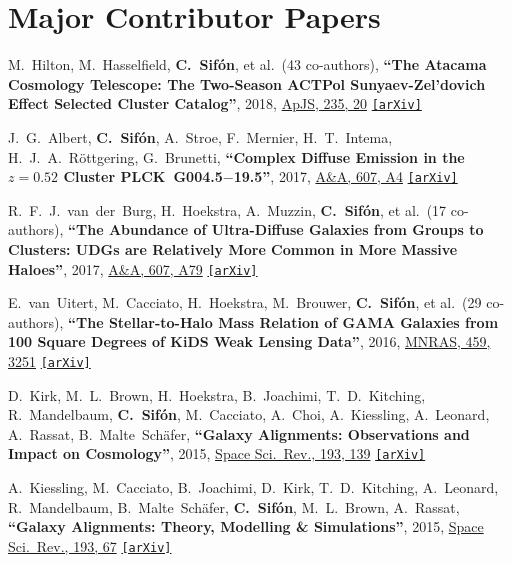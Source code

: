 \documentclass{article}
\def\aap{A\&A}
\def\apjs{ApJS}
\def\mnras{MNRAS}
\def\ssr{Space Sci.\ Rev.}
\newcommand{\myself}{\textbf{\color{red} C.~Sif\'on}}
\newcommand{\etal}[1]{et al.\ (#1 co-authors),}
\newcommand{\paper}[1]{\textbf{``#1''}}
\newcommand{\arxiv}[1]
    {\href{https://arxiv.org/abs/#1}{\texttt{\color{magenta}[arXiv]}}}
\begin{document}


\section*{Major Contributor Papers}

\begin{etaremune}

\item
M.~Hilton, M.~Hasselfield, \myself, \etal{43}
\paper{The Atacama Cosmology Telescope: The Two-Season ACTPol Sunyaev-Zel'dovich Effect Selected Cluster Catalog},
2018, \href{http://adsabs.harvard.edu/abs/2018ApJS..235...20H}{\apjs, 235, 20}
\arxiv{1709.05600}

\item
J.~G.~Albert, \myself, A.~Stroe, F.~Mernier, H.~T.~Intema, H.~J.~A.~R\"ottgering, 
G.~Brunetti,
\paper{Complex Diffuse Emission in the $z=0.52$ Cluster PLCK~G004.5$-$19.5},
2017, \href{http://adsabs.harvard.edu/abs/2017A&A...607A...4A}{\aap, 607, A4}
\arxiv{1708.00789}

\item
R.~F.~J.~van~der~Burg, H.~Hoekstra, A.~Muzzin, \myself, \etal{17}
\paper{The Abundance of Ultra-Diffuse Galaxies from Groups to Clusters: UDGs are Relatively More Common in More Massive Haloes},
2017, \href{http://adsabs.harvard.edu/abs/2017A&A...607A..79V}{\aap, 607, A79}
\arxiv{1706.02704}

\item
E.~van~Uitert, M.~Cacciato, H.~Hoekstra, M.~Brouwer, \myself, \etal{29}
\paper{The Stellar-to-Halo Mass Relation of GAMA Galaxies from 100 Square Degrees of KiDS Weak Lensing Data},
2016, \href{http://adsabs.harvard.edu/abs/2016MNRAS.459.3251V}{\mnras, 459, 3251}
\arxiv{1601.06791}

\item
D.~Kirk, M.~L.~Brown, H.~Hoekstra, B.~Joachimi, T.~D.~Kitching, R.~Mandelbaum, \myself, 
M.~Cacciato, A.~Choi, A.~Kiessling, A.~Leonard, A.~Rassat, B.~Malte~Sch\"afer,
\paper{Galaxy Alignments: Observations and Impact on Cosmology},
2015, \href{http://adsabs.harvard.edu/doi/10.1007/s11214-015-0213-4}{\ssr, 193, 139}
\arxiv{1504.05465}

\item
A.~Kiessling, M.~Cacciato, B.~Joachimi, D.~Kirk, T.~D.~Kitching, A.~Leonard, R.~Mandelbaum, B.~Malte~Sch\"afer, \myself, M.~L.~Brown, A.~Rassat,
\paper{Galaxy Alignments: Theory, Modelling \& Simulations},
2015, \href{http://adsabs.harvard.edu/doi/10.1007/s11214-015-0203-6}{\ssr, 193, 67}
\arxiv{1504.05546}


\end{etaremune}
\end{document}
